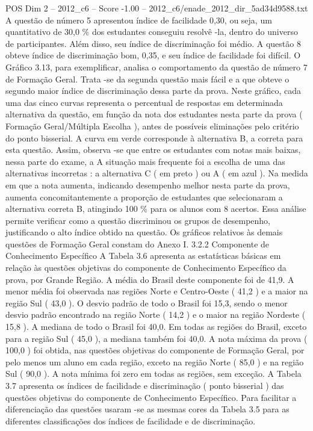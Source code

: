 \begin{textsample}{POS Dim 2 – 2012\_c6 – Score -1.00 – 2012\_c6/enade\_2012\_dir\_5ad34d9588.txt}
A questão de número 5 apresentou índice de facilidade 0,30, ou seja, um quantitativo de 30,0 \% dos estudantes conseguiu resolvê -la, dentro do universo de participantes.
Além disso, seu índice de discriminação foi médio.
A questão 8 obteve índice de discriminação bom, 0,35, e seu índice de facilidade foi difícil.
O Gráfico 3.13, para exemplificar, analisa o comportamento da questão de número 7 de Formação Geral.
Trata -se da segunda questão mais fácil e a que obteve o segundo maior índice de discriminação dessa parte da prova.
Neste gráfico, cada uma das cinco curvas representa o percentual de respostas em determinada alternativa da questão, em função da nota dos estudantes nesta parte da prova ( Formação Geral/Múltipla Escolha ), antes de possíveis eliminações pelo critério do ponto bisserial.
A curva em verde corresponde à alternativa B, a correta para esta questão.
Assim, observa -se que entre os estudantes com notas mais baixas, nessa parte do exame, a A situação mais frequente foi a escolha de uma das alternativas incorretas : a alternativa C ( em preto ) ou A ( em azul ).
Na medida em que a nota aumenta, indicando desempenho melhor nesta parte da prova, aumenta concomitantemente a proporção de estudantes que selecionaram a alternativa correta B, atingindo 100 \% para os alunos com 8 acertos.
Essa análise permite verificar como a questão discriminou os grupos de desempenho, justificando o alto índice obtido na questão.
Os gráficos relativos às demais questões de Formação Geral constam do Anexo I. 3.2.2 Componente de Conhecimento Específico A Tabela 3.6 apresenta as estatísticas básicas em relação às questões objetivas do componente de Conhecimento Específico da prova, por Grande Região.
A média do Brasil deste componente foi de 41,9.
A menor média foi observada nas regiões Norte e Centro-Oeste ( 41,2 ) e a maior na região Sul ( 43,0 ).
O desvio padrão de todo o Brasil foi 15,3, sendo o menor desvio padrão encontrado na região Norte ( 14,2 ) e o maior na região Nordeste ( 15,8 ).
A mediana de todo o Brasil foi 40,0.
Em todas as regiões do Brasil, exceto para a região Sul ( 45,0 ), a mediana também foi 40,0.
A nota máxima da prova ( 100,0 ) foi obtida, nas questões objetivas do componente de Formação Geral, por pelo menos um aluno em cada região, exceto na região Norte ( 85,0 ) e na região Sul ( 90,0 ).
A nota mínima foi zero em todas as regiões, sem exceção.
A Tabela 3.7 apresenta os índices de facilidade e discriminação ( ponto bisserial ) das questões objetivas do componente de Conhecimento Específico.
Para facilitar a diferenciação das questões usaram -se as mesmas cores da Tabela 3.5 para as diferentes classificações dos índices de facilidade e de discriminação.

\end{textsample}

